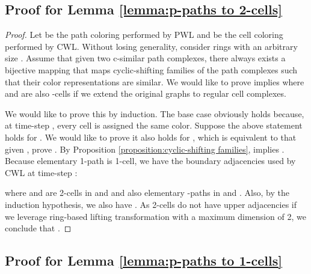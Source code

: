\documentclass[letterpaper]{article} \usepackage{aaai24}  \usepackage{times}  \usepackage{helvet}  \usepackage{courier}  \usepackage[hyphens]{url}  \usepackage{graphicx} \urlstyle{rm} \def\UrlFont{\rm}  \usepackage{natbib}  \usepackage{caption} \frenchspacing  \setlength{\pdfpagewidth}{8.5in} \setlength{\pdfpageheight}{11in} \usepackage{algorithm}
\begin{document}
\subsection{Proof for Lemma \ref{lemma:p-paths to 2-cells}}

\begin{proof}
    Let  be the path coloring performed by PWL and  be the cell coloring performed by CWL.
    Without losing generality, consider rings with an arbitrary size . Assume that given two c-similar path complexes, there always exists a bijective mapping that maps cyclic-shifting families of the path complexes such that their color representations are similar. We would like to prove  implies  where  and  are also -cells if we extend the original graphs to regular cell complexes.
    
    We would like to prove this by induction. The base case obviously holds because, at time-step , every cell is assigned the same color. Suppose the above statement holds for . We would like to prove it also holds for , which is equivalent to that given , prove . By Proposition \ref{proposition:cyclic-shifting families},   implies . Because elementary 1-path is 1-cell, we have the boundary adjacencies used by CWL at time-step :

where  and  are 2-cells in  and  and also elementary -paths in  and .
Also, by the induction hypothesis, we also have . As 2-cells do not have upper adjacencies if we leverage ring-based lifting transformation with a maximum dimension of 2, we conclude that .
\end{proof}

\subsection{Proof for Lemma \ref{lemma:p-paths to 1-cells}}
\end{document}
